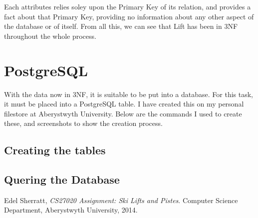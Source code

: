 \documentclass[11pt]{scrartcl} %
\begin{document}
Each attributes relies soley upon the Primary Key of its relation, and provides a fact about that Primary Key, providing no information about any other aspect of the database or of itself. From all this, we can see that Lift has been in 3NF throughout the whole process.

\newpage

\section{PostgreSQL}
With the data now in 3NF, it is suitable to be put into a database. For this task, it must be placed into a PostgreSQL table. I have created this on my personal filestore at Aberystwyth University. Below are the commands I used to create these, and screenshots to show the creation process.

\subsection{Creating the tables}

\subsection{Quering the Database}

\newpage

\begin{thebibliography}{9}

  Edel Sherratt,
  \emph{CS27020 Assignment: Ski Lifts and Pistes}.
  Computer Science Department,
  Aberystwyth University,
  2014.

\end{thebibliography}
\end{document}
